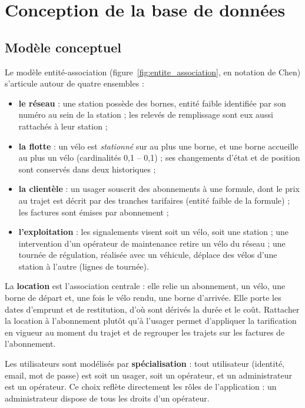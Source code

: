 \section{Conception de la base de données}\label{sec:conception}

\subsection{Modèle conceptuel}

Le modèle entité-association (figure~\ref{fig:entite_association}, en notation de Chen) s'articule autour de quatre ensembles :
\begin{itemize}
	\item \textbf{le réseau} : une station possède des bornes, entité faible identifiée par son numéro au sein de la station ; les relevés de remplissage sont eux aussi rattachés à leur station ;
	\item \textbf{la flotte} : un vélo est \emph{stationné} sur au plus une borne, et une borne accueille au plus un vélo (cardinalités 0,1 -- 0,1) ; ses changements d'état et de position sont conservés dans deux historiques ;
	\item \textbf{la clientèle} : un usager souscrit des abonnements à une formule, dont le prix au trajet est décrit par des tranches tarifaires (entité faible de la formule) ; les factures sont émises par abonnement ;
	\item \textbf{l'exploitation} : les signalements visent soit un vélo, soit une station ; une intervention d'un opérateur de maintenance retire un vélo du réseau ; une tournée de régulation, réalisée avec un véhicule, déplace des vélos d'une station à l'autre (lignes de tournée).
\end{itemize}

La \textbf{location} est l'association centrale : elle relie un abonnement, un vélo, une borne de départ et, une fois le vélo rendu, une borne d'arrivée. Elle porte les dates d'emprunt et de restitution, d'où sont dérivés la durée et le coût. Rattacher la location à l'abonnement plutôt qu'à l'usager permet d'appliquer la tarification en vigueur au moment du trajet et de regrouper les trajets sur les factures de l'abonnement.

Les utilisateurs sont modélisés par \textbf{spécialisation} : tout utilisateur (identité, email, mot de passe) est soit un usager, soit un opérateur, et un administrateur est un opérateur. Ce choix reflète directement les rôles de l'application : un administrateur dispose de tous les droits d'un opérateur.

